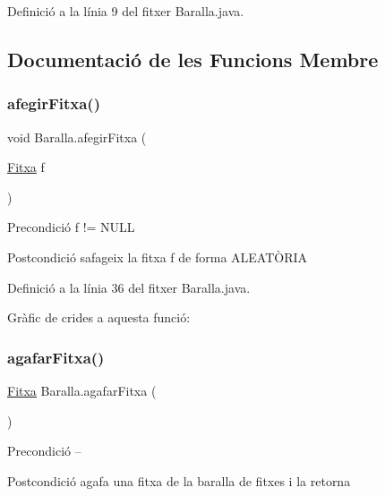 Definició a la línia 9 del fitxer Baralla.\+java.



\subsection{Documentació de les Funcions Membre}
\mbox{\label{class_baralla_a997d3f37894226927d02bfc4044378f2}} 
\subsubsection{\texorpdfstring{afegir\+Fitxa()}{afegirFitxa()}}
{\footnotesize\ttfamily void Baralla.\+afegir\+Fitxa (\begin{DoxyParamCaption}\item[{\mbox{\hyperlink{class_fitxa}{Fitxa}}}]{f }\end{DoxyParamCaption})}

\begin{DoxyPrecond}{Precondició}
f != N\+U\+LL 
\end{DoxyPrecond}
\begin{DoxyPostcond}{Postcondició}
s\textquotesingle{}afageix la fitxa f de forma A\+L\+E\+A\+TÒ\+R\+IA 
\end{DoxyPostcond}


Definició a la línia 36 del fitxer Baralla.\+java.

Gràfic de crides a aquesta funció\+:
\mbox{\label{class_baralla_a08558891cafb3b18b3927fe2a4ac109a}} 
\subsubsection{\texorpdfstring{agafar\+Fitxa()}{agafarFitxa()}}
{\footnotesize\ttfamily \mbox{\hyperlink{class_fitxa}{Fitxa}} Baralla.\+agafar\+Fitxa (\begin{DoxyParamCaption}{ }\end{DoxyParamCaption})}

\begin{DoxyPrecond}{Precondició}
-- 
\end{DoxyPrecond}
\begin{DoxyPostcond}{Postcondició}
agafa una fitxa de la baralla de fitxes i la retorna 
\end{DoxyPostcond}


